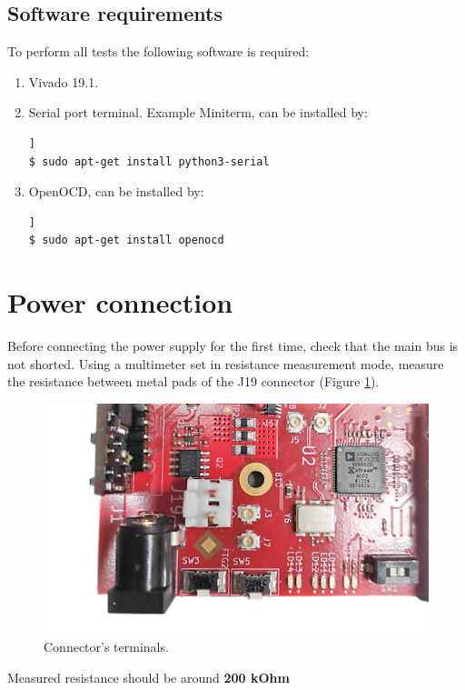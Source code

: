 \documentclass[12pt,oneside,a4]{article}
\begin{document}
\subsection{Software requirements}
To perform all tests the following software is required:
\begin{enumerate}
    \item Vivado 19.1.
    \item Serial port terminal. Example Miniterm, can be installed by:	\begin{lstlisting}[backgroundcolor = \color{Gainsboro}, language=bash, frame=none]]
$ sudo apt-get install python3-serial
	\end{lstlisting}
	\item OpenOCD, can be installed by:
	\begin{lstlisting}[backgroundcolor = \color{Gainsboro}, language=bash, frame=none]]
$ sudo apt-get install openocd
	\end{lstlisting}
\end{enumerate}

\section{Power connection}
Before connecting the power supply for the first time, check that the main bus is not shorted. Using a multimeter set in resistance measurement mode, measure the resistance between metal pads of the J19 connector (Figure \ref{01}).
\begin{figure}[H]
\begin{center}
\includegraphics[width=0.9\linewidth]{J19.png}
 \caption{Connector's terminals. }\label{01}
\end{center}
\end{figure}
\begin{leftbar}
Measured resistance should be around \textbf{{\color{red}200 kOhm}}
\end{leftbar}
\end{document}
